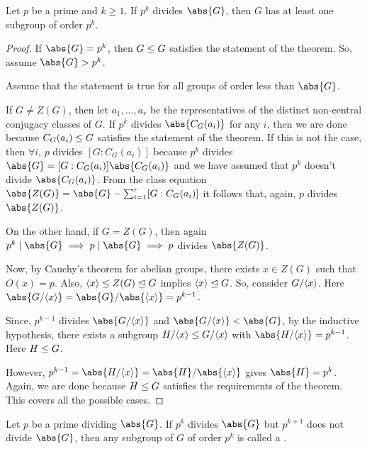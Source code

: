\documentclass[11pt]{penrose}
\begin{document}
\begin{nthm}
    Let $p$ be a prime and $k \geq 1$. If $p^{k}$ divides $\abs{G}$, then $G$ has at least one subgroup of order $p^{k}$.
\end{nthm}
\begin{proof}
    If $\abs{G} = p^{k}$, then $G \mathrel{\leq} G$ satisfies the statement of the theorem. So, assume $\abs{G} > p^{k}$.

    Assume that the statement is true for all groups of order less than $\abs{G}$.

    If $G \neq Z(G)$, then let $a_{1}, \dots, a_{r}$ be the representatives of the distinct non-central conjugacy classes of $G$. If $p^{k}$ divides $\abs{C_{G}(a_{i})}$ for any $i$, then we are done because $C_{G}(a_{i}) \mathrel{\leq} G$ satisfies the statement of the theorem. If this is not the case, then $\forall i$, $p$ divides $[G : C_{G}(a_{i})]$ because $p^{k}$ divides $\abs{G} = [G : C_{G}(a_{i})] \abs{C_{G}(a_{i})}$ and we have assumed that $p^{k}$ doesn't divide $\abs{C_{G}(a_{i})}$. From the class equation $\abs{Z(G)} = \abs{G} - \sum_{i=1}^{r} \comm{G : C_{G}(a_{i})}$ it follows that, again, $p$ divides $\abs{Z(G)}$.

    On the other hand, if $G = Z(G)$, then again $p^{k} \mid \abs{G} \implies p \mid \abs{G} \implies p$ divides $\abs{Z(G)}$.

    Now, by Cauchy's theorem for abelian groups, there exists $x \in Z(G)$ such that $O(x) = p$. Also, $\langle x\rangle \mathrel{\leq} Z(G) \mathrel{\trianglelefteq} G$ implies $\langle x\rangle \mathrel{\trianglelefteq} G$. So, consider $G / \langle x\rangle$. Here $\abs{G / \cyclic{x}} = \abs{G} / \abs{\cyclic{x}} = p^{k-1}$.

    Since, $p^{k-1}$ divides $\abs{G / \cyclic{x}}$ and $\abs{G / \cyclic{x}} < \abs{G}$, by the inductive hypothesis, there exists a subgroup $H / \langle x\rangle \mathrel{\leq} G / \langle x\rangle$ with $\abs{H / \cyclic{x}} = p^{k-1}$. Here $H \mathrel{\leq} G$.

    However, $p^{k-1} = \abs{H / \cyclic{x}} = \abs{H} / \abs{\cyclic{x}}$ gives $\abs{H} = p^{k}$. Again, we are done because $H \mathrel{\leq} G$ satisfies the requirements of the theorem. This covers all the possible cases.
\end{proof}

\begin{ndfn}
    Let $p$ be a prime dividing $\abs{G}$. If $p^{k}$ divides $\abs{G}$ but $p^{k+1} $ does not divide $\abs{G}$, then any subgroup of $G$ of order $p^{k}$ is called a .
\end{ndfn}
\end{document}
